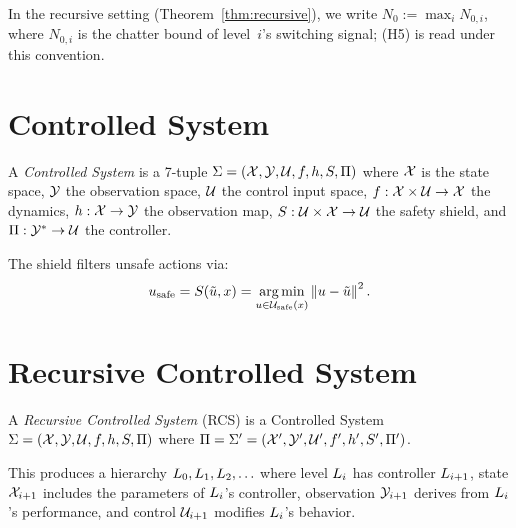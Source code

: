 \documentclass[conference]{IEEEtran}
\begin{document}
\begin{remark}
\label{rem:N0-standing-max}
In the recursive setting (Theorem~\ref{thm:recursive}), we write
$N_0 := \max_i N_{0,i}$, where $N_{0,i}$ is the chatter bound of
level~$i$'s switching signal; (H5) is read under this convention.
\end{remark}

\section{Controlled System}
\label{sec:controlled-system}

\begin{definition}
\label{def:cs}
A \emph{Controlled System} is a 7-tuple
$\Sigma = (\mathcal{X}, \mathcal{Y}, \mathcal{U}, f, h, S, \Pi)$
where $\mathcal{X}$ is the state space, $\mathcal{Y}$ the observation space, $\mathcal{U}$ the
control input space, $f : \mathcal{X} \times \mathcal{U} \to \mathcal{X}$ the dynamics,
$h : \mathcal{X} \to \mathcal{Y}$ the observation map, $S : \mathcal{U} \times \mathcal{X} \to \mathcal{U}$
the safety shield, and $\Pi : \mathcal{Y}^* \to \mathcal{U}$ the controller.

The shield filters unsafe actions via:
\begin{equation}
  u_{\text{safe}} = S(\tilde{u}, x)
  = \operatorname*{arg\,min}_{u \in \mathcal{U}_{\text{safe}}(x)} \left\| u - \tilde{u} \right\|^2.
\end{equation}
\end{definition}

\section{Recursive Controlled System}
\label{sec:rcs}

\begin{definition}
\label{def:rcs}
A \emph{Recursive Controlled System} (RCS) is a Controlled System
$\Sigma = (\mathcal{X}, \mathcal{Y}, \mathcal{U}, f, h, S, \Pi)$ where
$\Pi = \Sigma' = (\mathcal{X}', \mathcal{Y}', \mathcal{U}', f', h', S', \Pi')$.

This produces a hierarchy $L_{0}, L_{1}, L_{2}, \ldots$ where level
$L_{i}$ has controller $L_{i+1}$, state $\mathcal{X}_{i+1}$ includes the
parameters of $L_{i}$'s controller, observation $\mathcal{Y}_{i+1}$ derives from
$L_{i}$'s performance, and control $\mathcal{U}_{i+1}$ modifies $L_{i}$'s
behavior.
\end{definition}
\end{document}
